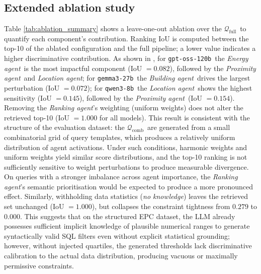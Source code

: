 \documentclass[runningheads,orivec]{llncs}
\newcommand{\rankingagent}{\textit{Ranking agent}}
\newcommand{\locationagent}{\textit{Location agent}}
\newcommand{\energyagent}{\textit{Energy agent}}
\newcommand{\proximityagent}{\textit{Proximity agent}}
\newcommand{\buildingagent}{\textit{Building agent}}
\newcommand{\gptoss}{\texttt{gpt-oss-120b}}
\newcommand{\gemma}{\texttt{gemma3-27b}}
\newcommand{\qwen}{\texttt{qwen3-8b}}
\newcommand{\combqueries}{$\mathcal{Q}_\text{comb}$}
\newcommand{\completequeries}{$\mathcal{Q}_\text{full}$}
\begin{document}
\subsection{Extended ablation study}

Table \ref{tab:ablation_summary} shows a leave-one-out ablation over the \completequeries\ to quantify each component's contribution.
Ranking IoU is computed between the top-10 of the ablated configuration and the full pipeline; a lower value indicates a higher discriminative contribution.
As shown in , for \gptoss\ the \energyagent\ is the most impactful component (IoU $= 0.082$), followed by the \proximityagent\ and \locationagent; for \gemma\ the \buildingagent\ drives the largest perturbation (IoU $= 0.072$); for \qwen\ the \locationagent\ shows the highest sensitivity (IoU $= 0.145$), followed by the \proximityagent\ (IoU $= 0.154$).
Removing the \rankingagent's weighting (uniform weights) does not alter the retrieved top-10 (IoU $= 1.000$ for all models). This result is consistent with the structure of the evaluation dataset: the \combqueries\ are generated from a small combinatorial grid of query templates, which produces a relatively uniform distribution of agent activations. Under such conditions, harmonic weights and uniform weights yield similar score distributions, and the top-10 ranking is not sufficiently sensitive to weight perturbations to produce measurable divergence. On queries with a stronger imbalance across agent importance, the \rankingagent's semantic prioritisation would be expected to produce a more pronounced effect.
Similarly, withholding data statistics (\textit{no knowledge}) leaves the retrieved set unchanged (IoU $= 1.000$), but collapses the constraint tightness from $0.279$ to $0.000$. This suggests that on the structured EPC dataset, the LLM already possesses sufficient implicit knowledge of plausible numerical ranges to generate syntactically valid SQL filters even without explicit statistical grounding; however, without injected quartiles, the generated thresholds lack discriminative calibration to the actual data distribution, producing vacuous or maximally permissive constraints.
\end{document}
